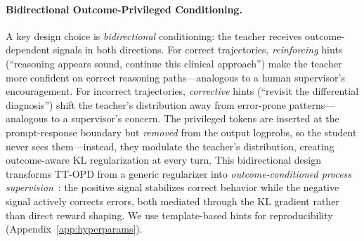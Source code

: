 \documentclass{article}
\begin{document}
\paragraph{Bidirectional Outcome-Privileged Conditioning.}
A key design choice is \emph{bidirectional} conditioning: the teacher receives outcome-dependent signals in both directions. For correct trajectories, \emph{reinforcing} hints (``reasoning appears sound, continue this clinical approach'') make the teacher more confident on correct reasoning paths---analogous to a human supervisor's encouragement. For incorrect trajectories, \emph{corrective} hints (``revisit the differential diagnosis'') shift the teacher's distribution away from error-prone patterns---analogous to a supervisor's concern. The privileged tokens are inserted at the prompt-response boundary but \emph{removed} from the output logprobs, so the student never sees them---instead, they modulate the teacher's distribution, creating outcome-aware KL regularization at every turn. This bidirectional design transforms TT-OPD from a generic regularizer into \emph{outcome-conditioned process supervision}~\citep{yang26rlsd, li26srpo}: the positive signal stabilizes correct behavior while the negative signal actively corrects errors, both mediated through the KL gradient rather than direct reward shaping. We use template-based hints for reproducibility (Appendix~\ref{app:hyperparams}).
\end{document}
